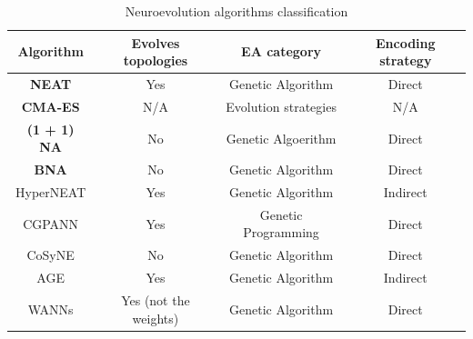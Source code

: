 \begin{table}[]
\caption{Neuroevolution algorithms classification}
\label{tab:neuroevolution_algorithms}
\centering
\begin{tabular}{|c|c|c|c|}
\hline
\textbf{Algorithm}  & \textbf{Evolves topologies} & \textbf{EA category}                                                             & \textbf{Encoding strategy}                                          \\ \hline
\textbf{NEAT} \cite{neat}     & Yes                         & Genetic Algorithm                                                                & Direct                                                    \\ \hline
\textbf{CMA-ES} \cite{cmaes}  & N/A                         & Evolution strategies                                                             & N/A                                                       \\ \hline
\textbf{(1 + 1) NA} \cite{na} & No                          & Genetic Algoerithm                                                               & Direct                                                    \\ \hline
\textbf{BNA} \cite{bna}       & No                          & Genetic Algorithm                                                                & Direct                                                    \\ \hline
HyperNEAT \cite{hyperneat}    & Yes                         & Genetic Algorithm                                                                & Indirect                                                  \\ \hline
CGPANN \cite{cgpann}          & Yes                         & Genetic Programming                                                              & Direct                                                    \\ \hline
CoSyNE \cite{cosyne}          & No                          & Genetic Algorithm                                                                & Direct                                                    \\ \hline
AGE \cite{age}                & Yes                         & Genetic Algorithm                                                                & Indirect                                                  \\ \hline
WANNs \cite{wanns}            & Yes (not the weights)       & Genetic Algorithm                                                                & Direct                                                    \\ \hline

\end{tabular}
\end{table}

